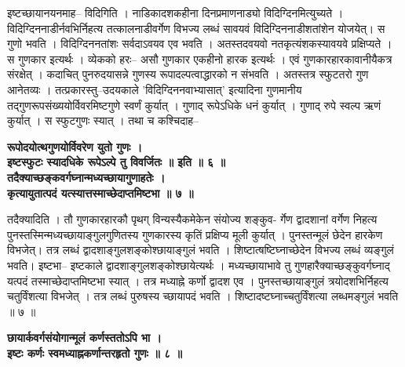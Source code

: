 \documentclass[11pt, openany]{book}
\begin{document}
{{{{\vspace{2mm}
\justifying
 इष्टच्छायानयनमाह-- विदिगिति । नाडिकादशकहीना दिनप्रमाणनाड्यो
विदिग्दिनमित्युच्यते । विदिग्दिननाडीर्नवभिर्निहत्य तत्कालनाडीवर्गेण
विभज्य
लब्धं सावयवं विदिग्दिननाडीशतांशेन योजयेत्। स गुणो भवति । विदिग्दिननतांशः
सर्वदाऽवयव एव भवति । अतस्तदवयवो   नतकृत्यंशकस्यावयवे
प्रक्षिप्यते । स गुणकार इत्यर्थः । व्येकको हरः--  असौ गुणकार
एकहीनो
हारक इत्यर्थः । एवं गुणकारहारकावानीयैकत्र संरक्षेत् । कदाचित्
पुनरुदयासन्ने
गुणस्य रूपादल्पत्वाद्धारको न संभवति । अतस्तत्र स्फुटतरो गुण
आनेतव्यः । 
तत्प्रकारस्तु--उदयकाले 'विदिग्दिननवाभ्यासात्'
इत्यादिना गुणमानीय
तद्गुणरूपसंख्ययोर्विवरमिष्टगुणे स्वर्णं कुर्यात् । गुणाद् रूपेऽधिके
धनं कुर्यात् ।
गुणाद् रुपे स्वल्प ऋणं कुर्यात् । स स्फुटगुणः स्यात् । तथा च
कश्चिदाह--

\newpage
\thispagestyle{fancy}
\fancyhf{}
\lhead{[त्रिप्रश्नाधिकारः]}
\centering
\textbf{
\hspace{-2cm}
 रूपोदयोत्थगुणयोर्विवरेण युतो गुणः ।\\
\hspace{1.5cm}
 इष्टस्फुटः स्यादधिके रूपेऽल्पे तु विवर्जितः ॥ इति ॥ ६ ॥\\
 \hspace{-1.5cm}
 तदैक्याच्छङ्कवर्गघ्नान्मध्यच्छायागुणाहतेः ।\\
  कृत्यायुतात्पदं यत्स्यात्तस्माच्छेदाप्तमिष्टभा ॥ ७ ॥}

\vspace{2mm}
\justifying
 तदैक्यादिति । तौ गुणकारहारकौ पृथग् विन्यस्यैकमेकेन संयोज्य शङ्कुव-
र्गेण द्वादशानां वर्गेण निहत्य पुनस्तस्मिन्मध्यच्छायाङ्गुलगुणितस्य
गुणकारस्य
कृतिं प्रक्षिप्य मूली कुर्यात् । पुनस्तन्मूलं छेदेन हारकेण विभजेत्।
तत्र लब्धं
द्वादशाङ्गुलशङ्कोश्छायाङ्गुलं भवति । शिष्टात्षष्टिघ्नाच्छेदेन विभज्य
लब्धं
व्यङ्गुलं भवति। इष्टभा-- इष्टकाले द्वादशाङ्गुलशङ्कोश्छायेत्यर्थः
। मध्यच्छायाभावे
तु गुणहारैक्याच्छङ्कुवर्गघ्नाद् यत्पदं तस्माच्छेदाप्तमिष्टभा
स्यात् । तत्र
मध्याह्ने कर्णो द्वादश एव । पुनस्तच्छायाङ्गुलं त्रयोदशभिर्निहत्य
चतुर्विंशत्या
विभजेत् । तत्र लब्धं पुरुषस्य च्छायापदं भवति ।
शिष्टादष्टघ्नाच्चतुर्विंशत्या
लब्धमङ्गुलं भवति ॥ ७ ॥

\vspace{2mm}
\centering
\textbf{
\hspace{-1.3cm}
 छायार्कवर्गसंयोगान्मूलं कर्णस्ततोऽपि भा ।\\
 इष्टः कर्णः स्वमध्याह्नकर्णान्तरहृतो गुणः ॥ ८ ॥}

}}}}
\end{document}

